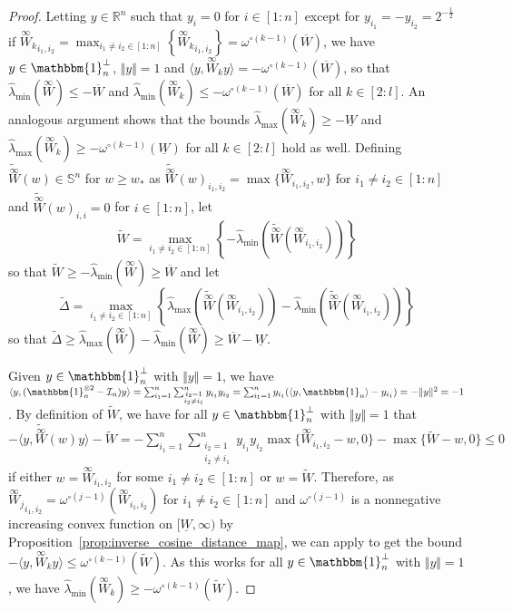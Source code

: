 \documentclass[twoside,11pt]{article}
\newcommand{\R}{\mathbb{R}}
\newcommand{\Id}{\mathcal{I}}
\newcommand{\limiting}[1]{\overset{\scriptscriptstyle\infty}{#1}}
\begin{document}
\begin{proof}
Letting $y \in \R^n$ such that $y_i = 0$ for $i \in [1:n]$ except for $y_{i_1} = -y_{i_2} = 2^{-\frac{1}{2}}$ if ${\limiting{W}_k}_{i_1,i_2} = \max_{i_1 \neq i_2 \in [1:n]}\left\{ {\limiting{W}_k}_{i_1,i_2} \right\} = \omega^{\circ (k-1)}(\overline{W})$, we have $y \in \mathbbm{1}_n^{\perp}$, $\Vert y \Vert = 1$ and $\langle y, \limiting{W}_k y \rangle = -\omega^{\circ (k-1)}(\overline{W})$, so that $\hat{\lambda}_{\min}(\limiting{W}) \leq -\overline{W}$ and $\hat{\lambda}_{\min}(\limiting{W}_k) \leq -\omega^{\circ (k-1)}(\overline{W})$ for all $k \in [2:l]$. An analogous argument shows that the bounds $\hat{\lambda}_{\max}(\limiting{W}_k) \geq -\underline{W}$ and $\hat{\lambda}_{\max}(\limiting{W}_k) \geq -\omega^{\circ (k-1)}(\underline{W})$ for all $k \in [2:l]$ hold as well. Defining $\widetilde{\limiting{W}}(w) \in \mathbb{S}^n$ for $w \geq w_*$ as $\widetilde{\limiting{W}}(w)_{i_1,i_2} = \max\{ \limiting{W}_{i_1,i_2}, w \}$ for $i_1 \neq i_2 \in [1:n]$ and $\widetilde{\limiting{W}}(w)_{i,i} = 0$ for $i \in [1:n]$, let
\[
\widetilde{W} = \max_{i_1 \neq i_2 \in [1:n]}\left\{ -\hat{\lambda}_{\min}\left( \widetilde{\limiting{W}}\left( \limiting{W}_{i_1,i_2} \right) \right) \right\}
\]
so that $\widetilde{W} \geq -\hat{\lambda}_{\min}(\limiting{W}) \geq \overline{W}$ and let
\[
\widetilde{\Delta} = \max_{i_1 \neq i_2 \in [1:n]}\left\{ \hat{\lambda}_{\max}\left( \widetilde{\limiting{W}}\left( \limiting{W}_{i_1,i_2} \right) \right) - \hat{\lambda}_{\min}\left( \widetilde{\limiting{W}}\left( \limiting{W}_{i_1,i_2} \right) \right) \right\}
\]
so that $\widetilde{\Delta} \geq \hat{\lambda}_{\max}(\limiting{W}) - \hat{\lambda}_{\min}(\limiting{W}) \geq \overline{W} - \underline{W}$.

Given $y \in \mathbbm{1}_n^{\perp}$ with $\Vert y \Vert = 1$, we have $\langle y, (\mathbbm{1}_n^{\otimes 2} - \Id_n) y \rangle = \sum_{i_1 = 1}^n \sum_{\substack{i_2=1 \\ i_2 \neq i_1}}^n y_{i_1} y_{i_2} = \sum_{i_1 = 1}^n y_{i_1} (\langle y, \mathbbm{1}_n \rangle - y_{i_1}) = -\Vert y \Vert^2 = -1$. By definition of $\widetilde{W}$, we have for all $y \in \mathbbm{1}_n^{\perp}$ with $\Vert y \Vert = 1$ that $-\langle y, \widetilde{\limiting{W}}(w) y \rangle - \widetilde{W} = -\sum_{i_1 = 1}^n \sum_{\substack{i_2=1 \\ i_2 \neq i_1}}^n y_{i_1} y_{i_2} \max\{ \limiting{W}_{i_1,i_2} - w, 0 \} - \max\{ \widetilde{W} - w, 0 \} \leq 0$ if either $w = \limiting{W}_{i_1,i_2}$ for some $i_1 \neq i_2 \in [1:n]$ or $w = \widetilde{W}$. Therefore, as ${\limiting{W}_j}_{i_1,i_2} = \omega^{\circ (j-1)}(\limiting{W}_{i_1,i_2})$ for $i_1 \neq i_2 \in [1:n]$ and $\omega^{\circ (j-1)}$ is a nonnegative increasing convex function on $[\underline{W},\infty)$ by Proposition~\ref{prop:inverse_cosine_distance_map}, we can apply \citet[Theorem~9(a\textsubscript{2})]{Horvath2023} to get the bound $-\langle y, \limiting{W}_k y \rangle \leq \omega^{\circ (k-1)}(\widetilde{W})$. As this works for all $y \in \mathbbm{1}_n^{\perp}$ with $\Vert y \Vert = 1$, we have $\hat{\lambda}_{\min}\left( \limiting{W}_k \right) \geq -\omega^{\circ (k-1)}(\widetilde{W})$.


\end{proof}
\end{document}
